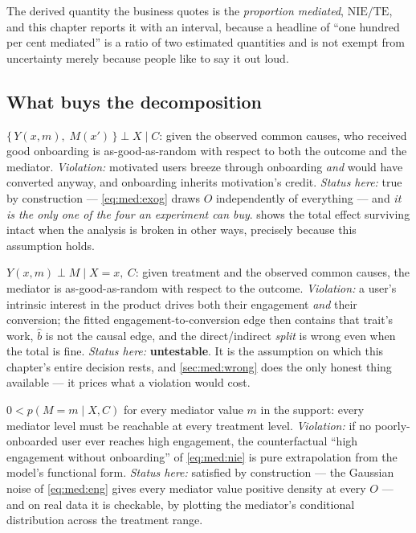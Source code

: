 The derived quantity the business quotes is the \emph{proportion mediated},
$\text{NIE}/\text{TE}$, and this chapter reports it with an interval, because a headline of ``one
hundred per cent mediated'' is a ratio of two estimated quantities and is not exempt from
uncertainty merely because people like to say it out loud.

\subsection*{What buys the decomposition}

\begin{assumption}\label{as:med:si1}
$\{\,Y(x,m),\; M(x')\,\} \perp X \mid C$: given the observed common causes, who received good
onboarding is as-good-as-random with respect to both the outcome and the mediator. \emph{Violation:}
motivated users breeze through onboarding \emph{and} would have converted anyway, and onboarding
inherits motivation's credit. \emph{Status here:} true by construction --- \cref{eq:med:exog}
draws $O$ independently of everything --- and \emph{it is the only one of the four an experiment
can buy}.  shows the total effect surviving intact when the analysis is broken
in other ways, precisely because this assumption holds.
\end{assumption}

\begin{assumption}\label{as:med:si2}
$Y(x,m) \perp M \mid X = x,\ C$: given treatment and the observed common causes, the mediator is
as-good-as-random with respect to the outcome. \emph{Violation:} a user's intrinsic interest in the
product drives both their engagement \emph{and} their conversion; the fitted
engagement-to-conversion edge then contains that trait's work, $\hat b$ is not the causal edge, and
the direct/indirect \emph{split} is wrong even when the total is fine. \emph{Status here:}
\textbf{untestable}. It is the assumption on which this chapter's entire decision rests, and
\cref{sec:med:wrong} does the only honest thing available --- it prices what a violation would cost.
\end{assumption}

\begin{assumption}[Positivity]\label{as:med:pos}
$0 < p(M = m \mid X, C)$ for every mediator value $m$ in the support: every mediator level must be
reachable at every treatment level. \emph{Violation:} if no poorly-onboarded user ever reaches high
engagement, the counterfactual ``high engagement without onboarding'' of \cref{eq:med:nie} is pure
extrapolation from the model's functional form. \emph{Status here:} satisfied by construction ---
the Gaussian noise of \cref{eq:med:eng} gives every mediator value positive density at every $O$ ---
and on real data it is checkable, by plotting the mediator's conditional distribution across the
treatment range.
\end{assumption}

